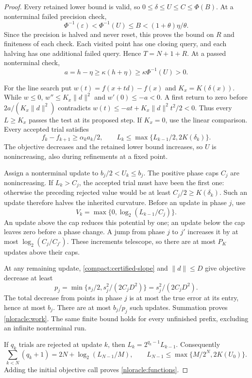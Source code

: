 \begin{proof}
Every retained lower bound is valid, so $0\le\delta\le U\le C\le\Phi(B)$.
At a nonterminal failed precision check,
\[
 \Phi^{-1}(\varepsilon)<\Phi^{-1}(U)\le B
   <(1+\theta)\eta/\theta.
\]
Since the precision is halved and never reset, this proves the bound on
$R$ and finiteness of each check. Each visited point has one closing
query, and each halving has one additional failed query. Hence $T=N+1+R$.
At a passed nonterminal check,
\begin{equation}\label{compact:certified-slope}
 a=h-\eta\ge\kappa(h+\eta)\ge\kappa\Phi^{-1}(U)>0.
\end{equation}

For the line search put $w(t)=f(x+td)-f(x)$ and $K_x=K(\delta(x))$.
While $w\le0$, $w''\le K_x\|d\|^2$ and $w'(0)\le-a<0$.
A first return to zero before $2a/(K_x\|d\|^2)$ contradicts
$w(t)\le-at+K_x\|d\|^2t^2/2<0$. Thus every $L\ge K_x$
passes the test at its proposed step. If $K_x=0$, use the linear
comparison. Every accepted trial satisfies
\begin{equation}\label{eq:acceptedprogress}
 f_k-f_{k+1}\ge\alpha_k a_k/2,\qquad
 L_k\le\max\{L_{k-1}/2,2K(\delta_k)\}.
\end{equation}
The objective decreases and the retained lower bound increases, so $U$
is nonincreasing, also during refinements at a fixed point.

Assign a nonterminal update to $b_j/2<U_k\le b_j$.
The positive phase caps $C_j$ are nonincreasing. If $L_k>C_j$,
the accepted trial must have been the first one: otherwise the preceding
rejected value would be at least $C_j/2\ge K(\delta_k)$.
Such an update therefore halves the inherited curvature.
Before an update in phase $j$, use
\[
 V_k=\max\{0,\log_2(L_{k-1}/C_j)\}.
\]
An update above the cap reduces this potential by one; an update below
the cap leaves zero before a phase change. A jump from phase $j$ to
$j'$ increases it by at most $\log_2(C_j/C_{j'})$. These increments
telescope, so there are at most $P_K$ updates above their caps.

At any remaining update, \eqref{compact:certified-slope} and $\|d\|\le D$
give objective decrease at least
\[
 p_j=\min\{s_j/2,s_j^2/(2C_jD^2)\}=s_j^2/(2C_jD^2).
\]
The total decrease from points in phase $j$ is at most the true error
at its entry, hence at most $b_j$. There are at most $b_j/p_j$ such
updates. Summation proves \eqref{nloracle:work}. The same finite bound
holds for every unfinished prefix, excluding an infinite nonterminal run.

If $q_k$ trials are rejected at update $k$, then
$L_k=2^{q_k-1}L_{k-1}$. Consequently
\[
 \sum_{k<N}(q_k+1)=2N+\log_2(L_{N-1}/M),\qquad
 L_{N-1}\le\max\{M/2^N,2K(U_0)\}.
\]
Adding the initial objective call proves \eqref{nloracle:functions}.
\end{proof}

